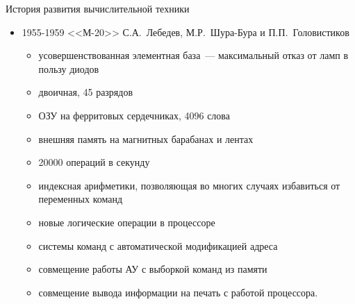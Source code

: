 \documentclass[aspectratio=169,14pt]{beamer}
\begin{document}
\begin{frame}{История развития вычислительной техники}
    \begin{itemize}
        \item 1955-1959 <<М-20>> С.А.~Лебедев, М.Р.~Шура-Бура и П.П.~Головистиков
        \begin{itemize}
            \item усовершенствованная элементная база~--- максимальный отказ от ламп
            в пользу диодов
            \item двоичная, 45 разрядов
            \item ОЗУ на ферритовых сердечниках, 4096 слова
            \item внешняя память на магнитных барабанах и лентах
            \item 20000 операций в секунду
            \item индексная арифметики, позволяющая во многих случаях избавиться от
            переменных команд
            \item новые логические операции в процессоре
            \item системы команд с автоматической модификацией адреса
            \item совмещение работы АУ с выборкой команд из памяти
            \item совмещение вывода информации на печать с работой процессора.
        \end{itemize}
    \end{itemize}
\end{frame}
\end{document}
